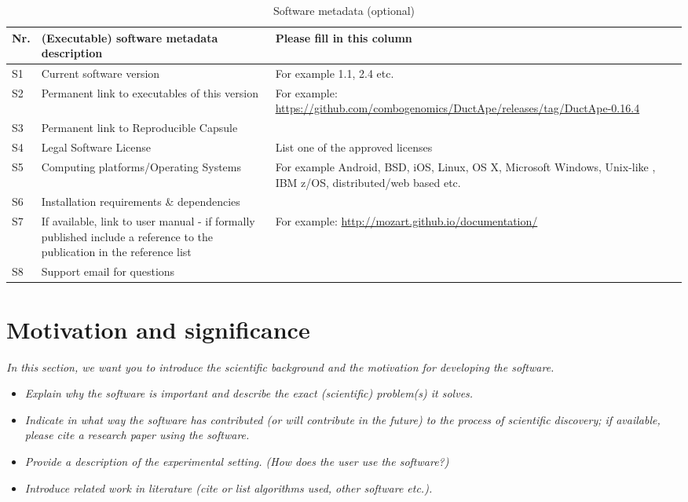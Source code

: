 \documentclass[preprint,12pt, a4paper]{elsarticle}
\begin{document}
\begin{table}[!h]
\begin{tabular}{|l|p{6.5cm}|p{6.5cm}|}
\hline
\textbf{Nr.} & \textbf{(Executable) software metadata description} & \textbf{Please fill in this column} \\
\hline
S1 & Current software version & For example 1.1, 2.4 etc. \\
\hline
S2 & Permanent link to executables of this version  & For example: \url{https://github.com/combogenomics/DuctApe/releases/tag/DuctApe-0.16.4} \\
\hline
S3  & Permanent link to Reproducible Capsule & \\
\hline
S4 & Legal Software License & List one of the approved licenses \\
\hline
S5 & Computing platforms/Operating Systems & For example Android, BSD, iOS, Linux, OS X, Microsoft Windows, Unix-like , IBM z/OS, distributed/web based etc. \\
\hline
S6 & Installation requirements \& dependencies & \\
\hline
S7 & If available, link to user manual - if formally published include a reference to the publication in the reference list & For example: \url{http://mozart.github.io/documentation/} \\
\hline
S8 & Support email for questions & \\
\hline
\end{tabular}
\caption{Software metadata (optional)}
\label{executabelMetadata} 
\end{table}


\section{Motivation and significance}
\textit{In this section, we want you to introduce the scientific background and the motivation for developing the software.}

\begin{itemize}
    \item \textit{Explain why the software is important and describe the exact (scientific) problem(s) it solves.}
    \item \textit{Indicate in what way the software has contributed (or will contribute in the future) to the process of scientific discovery; if available, please cite a research paper using the software.}
    \item \textit{Provide a description of the experimental setting. (How does the user use the software?)}
    \item \textit{Introduce related work in literature (cite or list algorithms used, other software etc.).}
\end{itemize}
\end{document}
